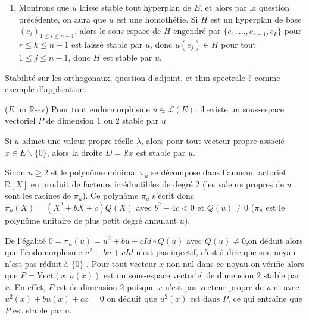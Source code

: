 \documentclass[answers,11pt]{exam}
\newcommand{\RR}{\mathbb{R}}
\begin{document}
\begin{questions}
\begin{solution}
\begin{enumerate}[label=\alph*)]
\begin{itemize}
			\item[$\romannumeral 4) \implies \romannumeral 5)$] Remplacer $E$ par $E^*$, c'est déjà vu.
			\item[$\romannumeral 5) \implies \romannumeral 1)$] Montrons que si $u^{\intercal}=\lambda Id_{E^*}$ alors $u=\lambda Id_{E}$. Supposons par l'absurde que ce ne soit pas le cas, alors il existe $x\in E\backslash\{0\}$ tel que $y=u(x)-\lambda x \neq 0$. On complète $y$ en une base de $E$ que l'on note $\mathcal{B}$, alors en considérant la forme linéaire $\varphi$ définie par $\varphi(y)=1$ et $\varphi(e)=0$ pour $e \in \mathcal{B}\backslash\{y\}$. On vérifie que $(u^{\intercal}(\varphi)-\lambda \varphi)(x)=\varphi(u(x))-\lambda \varphi(x)=\varphi(y)=1$, ce qui contredit l'homothétie de $u^{\intercal}$.
		\end{itemize}
		\item Montrons que $u$ laisse stable tout hyperplan de $E$, et alors par la question précédente, on aura que $u$ est une homothétie. Si $H$ est un hyperplan de base $(e_i)_{1 \leq i \leq n-1}$, alors le sous-espace de $H$ engendré par $\{e_1,\dots,e_{r-1},e_k\}$ pour $r \leq k \leq n-1$ est laissé stable par $u$, donc $u(e_j) \in H$ pour tout $1 \leq j \leq n-1$, donc $H$ est stable par $u$.
	\end{enumerate}
\end{solution}

\question Stabilité sur les orthogonaux, question d'adjoint, et thm spectrale ? comme exemple d'application.

\question ($E$ un $\RR$-ev) Pour tout endormorphisme $u \in \mathcal{L}(E)$, il existe un sous-espace vectoriel $P$ de dimension $1$ ou $2$ stable par $u$

\begin{solution}
	Si $u$ admet une valeur propre réelle $\lambda$, alors pour tout vecteur propre associé $x\in E\backslash\{0\}$, alors la droite $D=\RR x$ est stable par $u$. 
	
	Sinon $n \geq 2$ et le polynôme minimal $\pi_u$ se décompose dans l’anneau factoriel $\RR[X]$ en produit de facteurs irréductibles de degré $2$ (les valeurs propres de $u$ sont
les racines de $\pi_u$). Ce polynôme $\pi_u$ s’écrit donc $\pi_u(X) =(X^2 +bX+c)Q(X)$ avec $b^2-4c< 0$ et $Q (u) \neq 0$ ($\pi_u$ est le polynôme unitaire de plus petit degré
annulant $u$).

De l’égalité $0=\pi_u(u)= u^2 +b u+c Id  \circ Q(u)$ avec $Q(u)\neq 0$,on déduit alors
que l’endomorphisme $u^2 + bu + c Id$ n’est pas injectif, c’est-à-dire que son noyau n’est pas réduit à $\{0\}$ . Pour tout vecteur $x$ non nul dans ce noyau on vérifie alors que $P = \mathrm{Vect}(x, u(x))$ est un sous-espace vectoriel de dimension $2$ stable par $u$. En effet, $P$ est de dimension $2$ puisque $x$ n’est pas vecteur propre de $u$ et avec $u^2 (x)+bu(x)+cx = 0$ on déduit que $u^2(x)$ est dans $P$, ce qui entraîne que $P$ est stable par u.

\end{solution}


\end{questions}
\end{document}
